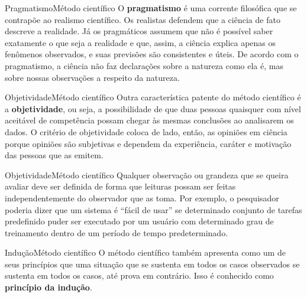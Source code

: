 \documentclass[t]{beamer}
\begin{document}

\begin{ftst}{Pragmatismo}{Método científico}
\vone
\justifying
O \textbf{pragmatismo} é uma corrente filosófica que se contrapõe ao realismo científico. Os realistas defendem que a ciência de
fato descreve a realidade. Já os pragmáticos assumem que não é possível saber exatamente o que seja a realidade e que, assim, a ciência explica apenas os fenômenos observados, e suas previsões são consistentes e úteis.
\vone
De acordo com o pragmatismo, a ciência não faz declarações sobre a natureza como ela é, mas sobre nossas observações a respeito
da natureza.


\end{ftst}


\begin{ftst}{Objetividade}{Método científico}
\vone
\justifying
Outra característica patente do método científico é a \textbf{objetividade}, ou seja, a possibilidade de que duas pessoas quaisquer com nível aceitável de competência possam chegar às mesmas conclusões ao analisarem os dados.
\vone
O critério de objetividade coloca de lado, então, as opiniões em ciência porque opiniões são subjetivas e dependem da experiência, caráter e motivação das pessoas que as emitem.


\end{ftst}


\begin{ftst}{Objetividade}{Método científico}
\vone
\justifying
Qualquer observação ou grandeza que se queira avaliar deve ser definida de forma que
leituras possam ser feitas independentemente do observador que as toma.
\vone
Por exemplo, o pesquisador poderia dizer que um sistema é “fácil de usar” se determinado conjunto de tarefas predefinido puder ser executado por um usuário com determinado grau de treinamento dentro de um período de tempo predeterminado. 


\end{ftst}



\begin{ftst}{Indução}{Método científico}
\vone
\justifying
O método científico também apresenta como um de seus princípios que uma situação que se sustenta em todos os casos observados se sustenta em todos os casos, até prova em contrário. Isso é conhecido como \textbf{princípio da indução}.
\vone



\end{ftst}
\end{document}
